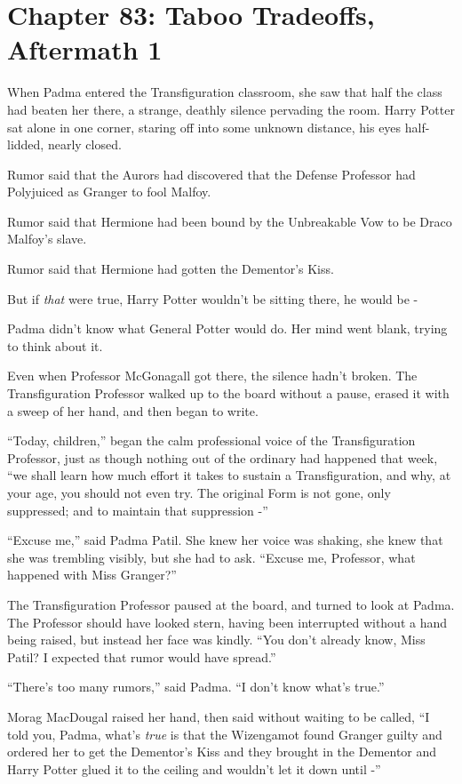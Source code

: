\chapter{Chapter 83: Taboo Tradeoffs, Aftermath 1}
When Padma entered the Transfiguration classroom, she saw that half the
class had beaten her there, a strange, deathly silence pervading the
room. Harry Potter sat alone in one corner, staring off into some
unknown distance, his eyes half-lidded, nearly closed.

Rumor said that the Aurors had discovered that the Defense Professor had
Polyjuiced as Granger to fool Malfoy.

Rumor said that Hermione had been bound by the Unbreakable Vow to be
Draco Malfoy's slave.

Rumor said that Hermione had gotten the Dementor's Kiss.

But if \emph{that} were true, Harry Potter wouldn't be sitting there, he
would be -

Padma didn't know what General Potter would do. Her mind went blank,
trying to think about it.

Even when Professor McGonagall got there, the silence hadn't broken. The
Transfiguration Professor walked up to the board without a pause, erased
it with a sweep of her hand, and then began to write.

``Today, children,'' began the calm professional voice of the
Transfiguration Professor, just as though nothing out of the ordinary
had happened that week, ``we shall learn how much effort it takes to
sustain a Transfiguration, and why, at your age, you should not even
try. The original Form is not gone, only suppressed; and to maintain
that suppression -''

``Excuse me,'' said Padma Patil. She knew her voice was shaking, she
knew that she was trembling visibly, but she had to ask. ``Excuse me,
Professor, what happened with Miss Granger?''

The Transfiguration Professor paused at the board, and turned to look at
Padma. The Professor should have looked stern, having been interrupted
without a hand being raised, but instead her face was kindly. ``You
don't already know, Miss Patil? I expected that rumor would have
spread.''

``There's too many rumors,'' said Padma. ``I don't know what's true.''

Morag MacDougal raised her hand, then said without waiting to be called,
``I told you, Padma, what's \emph{true} is that the Wizengamot found
Granger guilty and ordered her to get the Dementor's Kiss and they
brought in the Dementor and Harry Potter glued it to the ceiling and
wouldn't let it down until -''

